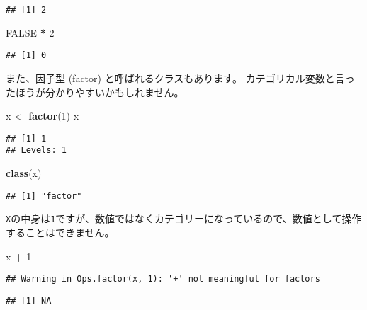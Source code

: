 \documentclass[]{bxjsarticle}
\newenvironment{Shaded}{\begin{snugshade}}{\end{snugshade}}
\newcommand{\DecValTok}[1]{\textcolor[rgb]{0.00,0.00,0.81}{#1}}
\newcommand{\KeywordTok}[1]{\textcolor[rgb]{0.13,0.29,0.53}{\textbf{#1}}}
\newcommand{\NormalTok}[1]{#1}
\newcommand{\OperatorTok}[1]{\textcolor[rgb]{0.81,0.36,0.00}{\textbf{#1}}}
\newcommand{\OtherTok}[1]{\textcolor[rgb]{0.56,0.35,0.01}{#1}}
\newcommand{\StringTok}[1]{\textcolor[rgb]{0.31,0.60,0.02}{#1}}
\begin{document}
\begin{verbatim}
## [1] 2
\end{verbatim}

\begin{Shaded}
\begin{Highlighting}[]
\OtherTok{FALSE} \OperatorTok{*}\StringTok{ }\DecValTok{2}
\end{Highlighting}
\end{Shaded}

\begin{verbatim}
## [1] 0
\end{verbatim}

また、因子型 (factor) と呼ばれるクラスもあります。
カテゴリカル変数と言ったほうが分かりやすいかもしれません。

\begin{Shaded}
\begin{Highlighting}[]
\NormalTok{x <-}\StringTok{ }\KeywordTok{factor}\NormalTok{(}\DecValTok{1}\NormalTok{)}
\NormalTok{x}
\end{Highlighting}
\end{Shaded}

\begin{verbatim}
## [1] 1
## Levels: 1
\end{verbatim}

\begin{Shaded}
\begin{Highlighting}[]
\KeywordTok{class}\NormalTok{(x)}
\end{Highlighting}
\end{Shaded}

\begin{verbatim}
## [1] "factor"
\end{verbatim}

\texttt{X}の中身は\texttt{1}ですが、数値ではなくカテゴリーになっているので、数値として操作することはできません。

\begin{Shaded}
\begin{Highlighting}[]
\NormalTok{x }\OperatorTok{+}\StringTok{ }\DecValTok{1}
\end{Highlighting}
\end{Shaded}

\begin{verbatim}
## Warning in Ops.factor(x, 1): '+' not meaningful for factors
\end{verbatim}

\begin{verbatim}
## [1] NA
\end{verbatim}
\end{document}
